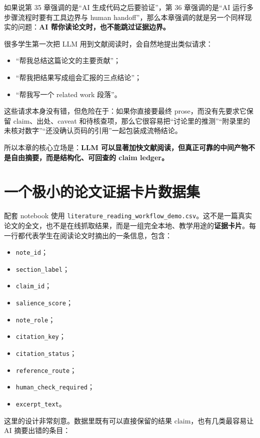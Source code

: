 如果说第 35 章强调的是“AI 生成代码之后要验证”，第 36 章强调的是“AI 运行多步骤流程时要有工具边界与 human handoff”，那么本章强调的就是另一个同样现实的问题：\textbf{AI 帮你读论文时，也不能跳过证据边界。}

很多学生第一次把 LLM 用到文献阅读时，会自然地提出类似请求：

\begin{itemize}
    \item “帮我总结这篇论文的主要贡献”；
    \item “帮我把结果写成组会汇报的三点结论”；
    \item “帮我写一个 related work 段落”。
\end{itemize}

这些请求本身没有错，但危险在于：如果你直接要最终 prose，而没有先要求它保留 claim、出处、caveat 和待核查项，那么它很容易把“讨论里的推测”“附录里的未核对数字”“还没确认页码的引用”一起包装成流畅结论。

所以本章的核心立场是：\textbf{LLM 可以显著加快文献阅读，但真正可靠的中间产物不是自由摘要，而是结构化、可回查的 claim ledger。}

\section{一个极小的论文证据卡片数据集}

配套 notebook 使用 \nolinkurl{literature_reading_workflow_demo.csv}。这不是一篇真实论文的全文，也不是在线抓取结果，而是一组完全本地、教学用途的\textbf{证据卡片}。每一行都代表学生在阅读论文时摘出的一条信息，包含：

\begin{itemize}
    \item \texttt{note\_id}；
    \item \texttt{section\_label}；
    \item \texttt{claim\_id}；
    \item \texttt{salience\_score}；
    \item \texttt{note\_role}；
    \item \texttt{citation\_key}；
    \item \texttt{citation\_status}；
    \item \texttt{reference\_route}；
    \item \texttt{human\_check\_required}；
    \item \texttt{excerpt\_text}。
\end{itemize}

这里的设计非常刻意。数据里既有可以直接保留的结果 claim，也有几类最容易让 AI 摘要出错的条目：

